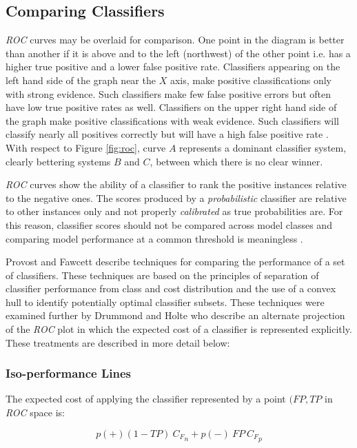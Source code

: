 \documentclass[10pt]{unbthesis}
\begin{document}
\subsection{Comparing Classifiers}
\textit{ROC} curves may be overlaid for comparison. One
point in the diagram is better than another if it is above and to the
left (northwest)
of the other point i.e. has a higher true positive and a lower false positive
rate. Classifiers appearing on the left hand side of the graph near
the \(X\) axis, make positive
classifications only with strong evidence. Such classifiers make few
false positive errors but often have low true positive rates as
well. Classifiers on the upper right hand side of the graph make
positive classifications with weak evidence. Such classifiers will
classify nearly all positives correctly but will have a high false
positive rate \cite{RefWorks:39}. With respect to Figure \ref{fig:roc},
curve \(A\) represents a dominant classifier system, clearly bettering
systems \(B\) and \(C\), between which there is no clear winner. 

\textit{ROC} curves show the ability of a classifier to rank the
positive instances relative to the negative ones. The scores produced
by a \textit{probabilistic} classifier are relative to other instances
only and not properly \textit{calibrated} as true probabilities
are. For this reason, classifier scores should not be compared across
model classes and comparing model performance at a common threshold is
meaningless \cite{RefWorks:39}. 

Provost and Fawcett \cite{RefWorks:61} describe techniques for
comparing the performance of a set of classifiers. These
techniques are based on the principles of separation of classifier
performance from class and cost distribution and the use of a convex
hull to identify potentially optimal classifier subsets. These
techniques were examined further by Drummond and Holte
\cite{RefWorks:52} who describe an alternate projection of the
\textit{ROC} plot in which the expected cost of a classifier is
represented explicitly. These treatments are described in more detail
below: 


\subsubsection{Iso-performance Lines}
The expected cost of applying the classifier represented by a point
\((FP, TP\) in \textit{ROC} space  is:

\begin{equation}
\label{equ:expectedcost}
p(+)(1-TP)\:{C_F}_n + p(-)\:FP\:{C_F}_p
\end{equation}
\end{document}
